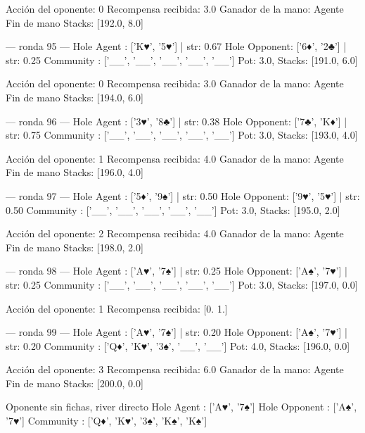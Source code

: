 Acción del oponente: 0
Recompensa recibida: 3.0
Ganador de la mano: Agente
Fin de mano Stacks: [192.0, 8.0]


--- ronda 95 ---
Hole Agent : ['K♥', '5♥'] | str: 0.67
Hole Opponent: ['6♦', '2♣'] | str: 0.25
Community  : ['__', '__', '__', '__', '__']
Pot: 3.0, Stacks: [191.0, 6.0]

Acción del oponente: 0
Recompensa recibida: 3.0
Ganador de la mano: Agente
Fin de mano Stacks: [194.0, 6.0]


--- ronda 96 ---
Hole Agent : ['3♥', '8♣'] | str: 0.38
Hole Opponent: ['7♣', 'K♦'] | str: 0.75
Community  : ['__', '__', '__', '__', '__']
Pot: 3.0, Stacks: [193.0, 4.0]

Acción del oponente: 1
Recompensa recibida: 4.0
Ganador de la mano: Agente
Fin de mano Stacks: [196.0, 4.0]


--- ronda 97 ---
Hole Agent : ['5♦', '9♠'] | str: 0.50
Hole Opponent: ['9♥', '5♥'] | str: 0.50
Community  : ['__', '__', '__', '__', '__']
Pot: 3.0, Stacks: [195.0, 2.0]

Acción del oponente: 2
Recompensa recibida: 4.0
Ganador de la mano: Agente
Fin de mano Stacks: [198.0, 2.0]


--- ronda 98 ---
Hole Agent : ['A♥', '7♠'] | str: 0.25
Hole Opponent: ['A♠', '7♥'] | str: 0.25
Community  : ['__', '__', '__', '__', '__']
Pot: 3.0, Stacks: [197.0, 0.0]

Acción del oponente: 1
Recompensa recibida: [0. 1.]

--- ronda 99 ---
Hole Agent : ['A♥', '7♠'] | str: 0.20
Hole Opponent: ['A♠', '7♥'] | str: 0.20
Community  : ['Q♦', 'K♥', '3♠', '__', '__']
Pot: 4.0, Stacks: [196.0, 0.0]

Acción del oponente: 3
Recompensa recibida: 6.0
Ganador de la mano: Agente
Fin de mano Stacks: [200.0, 0.0]


Oponente sin fichas, river directo
Hole Agent    : ['A♥', '7♠']
Hole Opponent : ['A♠', '7♥']
Community     : ['Q♦', 'K♥', '3♠', 'K♠', 'K♠']
